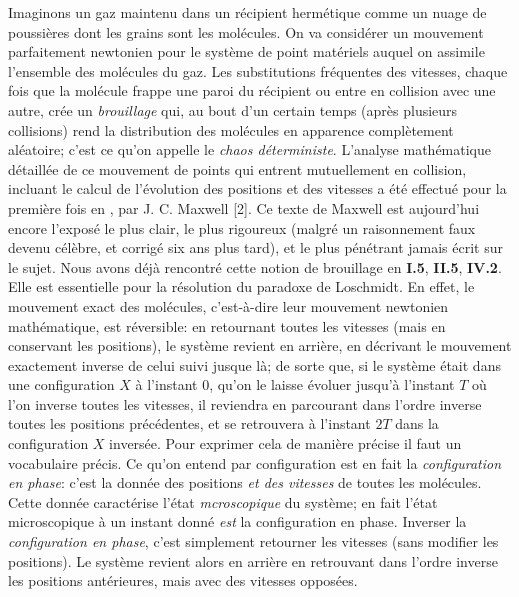 \medskip
Imaginons un gaz maintenu dans un r\'ecipient herm\'etique comme un nuage
de poussi\`eres dont les grains sont les mol\'ecules. On va consid\'erer 
un mouvement parfaitement newtonien pour le syst\`eme de point mat\'eriels 
auquel on assimile l'ensemble des mol\'ecules du gaz. Les substitutions 
fr\'equentes des vitesses, chaque fois que la mol\'ecule frappe une 
paroi du r\'ecipient ou entre en collision avec une autre, cr\'ee un 
{\it brouillage} qui, au bout d'un certain temps (apr\`es plusieurs 
collisions) rend la distribution des mol\'ecules en apparence compl\`etement 
al\'eatoire; c'est ce qu'on appelle le {\it chaos d\'eterministe}. 
L'analyse math\'ematique d\'etaill\'ee de ce mouvement de points qui 
entrent mutuellement en collision, incluant le calcul de l'\'evolution 
des positions et des vitesses a \'et\'e effectu\'e pour la premi\`ere 
fois en {},  par J. C. Maxwell [2]. Ce texte de Maxwell
est aujourd'hui encore l'expos\'e le plus clair, le plus rigoureux 
(malgr\'e un raisonnement faux devenu c\'el\`ebre, et corrig\'e six ans 
plus tard), et le plus p\'en\'etrant jamais \'ecrit sur le sujet. 
\medskip
Nous avons d\'ej\`a rencontr\'e cette notion de brouillage en {\bf I.5}, 
{\bf II.5}, {\bf IV.2}. Elle est essentielle pour la r\'esolution du 
paradoxe de Loschmidt.  En effet, le mouvement exact des mol\'ecules,
c'est-\`a-dire leur mouvement newtonien math\'ematique, est 
r\'eversible: en retournant toutes les vitesses (mais en conservant les 
positions), le syst\`eme revient en arri\`ere, en d\'ecrivant le mouvement 
exactement inverse de celui suivi jusque l\`a; de sorte que, si le syst\`eme 
\'etait dans une configuration $X$ \`a l'instant $0$, qu'on le laisse
\'evoluer jusqu'\`a l'instant $T$ o\`u l'on inverse toutes les vitesses, 
il reviendra en parcourant dans l'ordre inverse toutes les positions 
pr\'ec\'edentes, et se retrouvera \`a l'instant $2T$ dans la 
configuration $X$ invers\'ee. Pour exprimer cela de mani\`ere pr\'ecise il 
faut un vocabulaire pr\'ecis. Ce qu'on entend par configuration est en fait 
la {\it configuration en phase}: c'est la donn\'ee des positions 
{\it et des vitesses} de toutes les mol\'ecules. Cette donn\'ee 
caract\'erise l'\'etat {\it mcroscopique} 
du syst\`eme; en fait l'\'etat microscopique \`a un instant donn\'e 
{\it est} la configuration en phase. Inverser la {\it configuration en phase}, 
c'est simplement retourner les vitesses (sans modifier les positions). 
Le syst\`eme revient alors en arri\`ere en retrouvant dans l'ordre 
inverse les positions ant\'erieures, mais avec des vitesses oppos\'ees.
